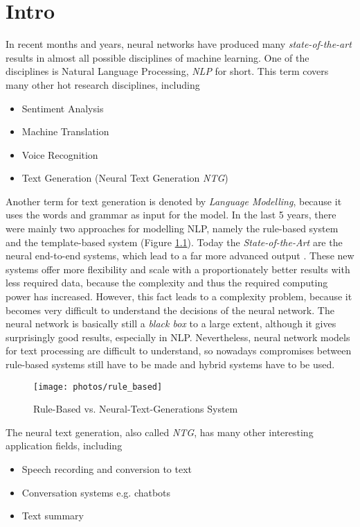 \chapter{Intro}\label{ch:intro}

In recent months and years, neural networks have produced many \textit{state-of-the-art} results in almost all possible disciplines of machine learning. One of the disciplines is Natural Language Processing, \textit{NLP} for short. This term covers many other hot research disciplines, including 

\begin{itemize}
\item Sentiment Analysis
\item Machine Translation
\item Voice Recognition
\item Text Generation (Neural Text Generation \textit{NTG})
\end{itemize}

Another term for text generation is denoted by \textit{Language Modelling}, because it uses the words and grammar as input for the model. In the last 5 years, there were mainly two approaches for modelling NLP, namely the rule-based system and the template-based system (Figure \ref{rules_based}). Today the \textit{State-of-the-Art} are the neural end-to-end systems, which lead to a far more advanced output \cite{End_to_End}. These new systems offer more flexibility and scale with a proportionately better results with less required data, because the complexity and thus the required computing power has increased. However, this fact leads to a complexity problem, because it becomes very difficult to understand the decisions of the neural network. The neural network is basically still a \textit{black box} to a large extent, although it gives surprisingly good results, especially in NLP. Nevertheless, neural network models for text processing are difficult to understand, so nowadays compromises between rule-based systems still have to be made and hybrid systems have to be used. 

\begin{figure}
  \begin{center}
  \texttt{[image: photos/rule\_based]}\\
  \caption{Rule-Based vs. Neural-Text-Generations System \cite{End_to_End}}\label{rules_based}
  \end{center}
\end{figure}

The neural text generation, also called \textit{NTG}, has many other interesting application fields, including
\begin{itemize}
\item Speech recording and conversion to text
\item Conversation systems e.g. chatbots
\item Text summary
\end{itemize} 


